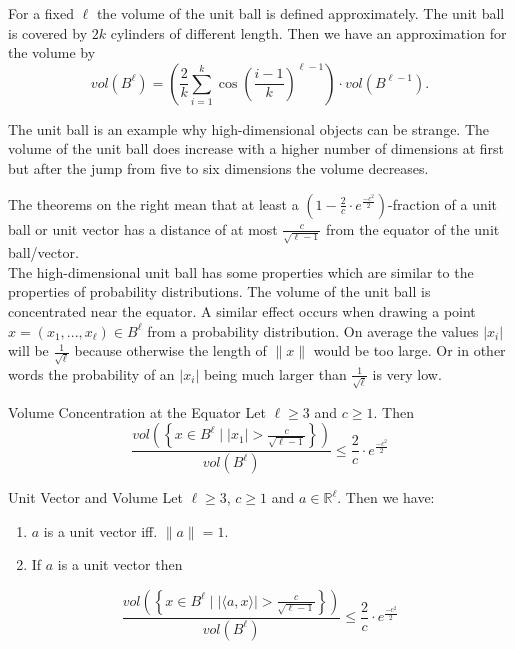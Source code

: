 \documentclass{panikzettel}
\begin{document}
For a fixed $\ell$ the volume of the unit ball is defined approximately. The unit ball is covered by $2k$ cylinders of different length. Then we have an approximation for the volume by
\[
vol(B^\ell)=\left(\frac{2}{k} \sum_{i=1}^k \cos \left( \frac{i-1}{k}\right)^{\ell-1} \right)\cdot vol(B^{\ell-1}).
\]

The unit ball is an example why high-dimensional objects can be strange. The volume of the unit ball does increase with a higher number of dimensions at first but after the jump from five to six dimensions the volume decreases.

\begin{halfboxl}
\vspace{-\baselineskip}
	The theorems on the right mean that at least a $(1-\frac{2}{c}\cdot e^{\frac{-c^2}{2}})$-fraction of a unit ball or unit vector has a distance of at most $\frac{c}{\sqrt{\ell -1}}$ from the equator of the unit ball/vector.\\

	The high-dimensional unit ball has some properties which are similar to the properties of probability distributions. The volume of the unit ball is concentrated near the equator. A similar effect occurs when drawing a point $x=(x_1,...,x_\ell)\in B^\ell$ from a probability distribution. On average the values $|x_i|$ will be $\frac{1}{\sqrt{\ell}}$ because otherwise the length of $\parallel x\parallel$ would be too large. Or in other words the probability of an $|x_i|$ being much larger than $\frac{1}{\sqrt{\ell}}$ is very low.
\end{halfboxl}
\begin{halfboxr}
\vspace{-\baselineskip}
	\begin{theo}{Volume Concentration at the Equator}
	Let $\ell\geq 3$ and $c\geq 1$. Then
	\[
	\frac{vol\left(\left\lbrace x\in B^\ell \mid |x_1|>\frac{c}{\sqrt{\ell-1}} \right\rbrace\right)}{vol(B^\ell)}\leq \frac{2}{c}\cdot e^{\frac{-c^2}{2}}
	\]
	\end{theo}
	\begin{theo}{Unit Vector and Volume}
	Let $\ell\geq 3$, $c\geq 1$ and $a\in\mathbb{R}^\ell$. Then we have:
	\begin{enumerate}
	\item $a$ is a unit vector iff. $\parallel a \parallel =1$.
	\item If $a$ is a unit vector then
	\end{enumerate}
	\[
	\frac{vol\left(\left\lbrace x\in B^\ell \mid |\langle a,x \rangle|>\frac{c}{\sqrt{\ell-1}} \right\rbrace\right)}{vol(B^\ell)}\leq \frac{2}{c}\cdot e^{\frac{-c^2}{2}}
	\]

	\end{theo}
\end{halfboxr}
\end{document}
